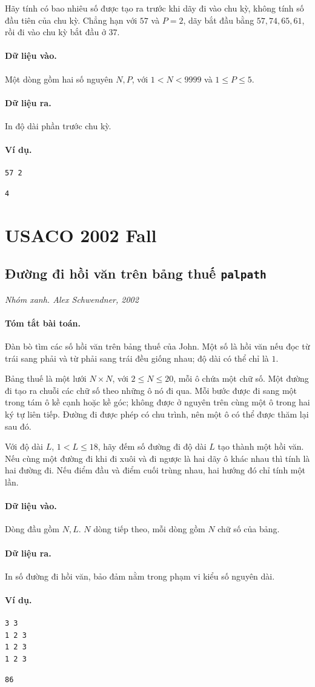 \documentclass[11pt]{article}
\newcommand{\problem}[4]{%
  \subsection[#1 (#2)]{#1 \hfill {\normalsize\texttt{#2}}}%
  \noindent\textit{#3. #4}\par\smallskip
}
\newcommand{\iosec}[1]{\paragraph{#1}}
\begin{document}
Hãy tính có bao nhiêu số được tạo ra trước khi dãy đi vào chu kỳ, không tính
số đầu tiên của chu kỳ. Chẳng hạn với \(57\) và \(P=2\), dãy bắt đầu bằng
\(57,74,65,61\), rồi đi vào chu kỳ bắt đầu ở \(37\).

\iosec{Dữ liệu vào.}
Một dòng gồm hai số nguyên \(N,P\), với \(1<N<9999\) và \(1\le P\le 5\).

\iosec{Dữ liệu ra.}
In độ dài phần trước chu kỳ.

\iosec{Ví dụ.}
\begin{verbatim}
57 2
\end{verbatim}

\begin{verbatim}
4
\end{verbatim}

\section{USACO 2002 Fall}

\problem{Đường đi hồi văn trên bảng thuế}{palpath}{Nhóm xanh}{Alex Schwendner, 2002}

\iosec{Tóm tắt bài toán.}
Đàn bò tìm các số hồi văn trên bảng thuế của John. Một số là hồi văn nếu đọc
từ trái sang phải và từ phải sang trái đều giống nhau; độ dài có thể chỉ là
\(1\).

Bảng thuế là một lưới \(N\times N\), với \(2\le N\le 20\), mỗi ô chứa một chữ
số. Một đường đi tạo ra chuỗi các chữ số theo những ô nó đi qua. Mỗi bước được
đi sang một trong tám ô kề cạnh hoặc kề góc; không được ở nguyên trên cùng một
ô trong hai ký tự liên tiếp. Đường đi được phép có chu trình, nên một ô có thể
được thăm lại sau đó.

Với độ dài \(L\), \(1<L\le 18\), hãy đếm số đường đi độ dài \(L\) tạo thành
một hồi văn. Nếu cùng một đường đi khi đi xuôi và đi ngược là hai dãy ô khác
nhau thì tính là hai đường đi. Nếu điểm đầu và điểm cuối trùng nhau, hai hướng
đó chỉ tính một lần.

\iosec{Dữ liệu vào.}
Dòng đầu gồm \(N,L\). \(N\) dòng tiếp theo, mỗi dòng gồm \(N\) chữ số của bảng.

\iosec{Dữ liệu ra.}
In số đường đi hồi văn, bảo đảm nằm trong phạm vi kiểu số nguyên dài.

\iosec{Ví dụ.}
\begin{verbatim}
3 3
1 2 3
1 2 3
1 2 3
\end{verbatim}

\begin{verbatim}
86
\end{verbatim}
\end{document}
